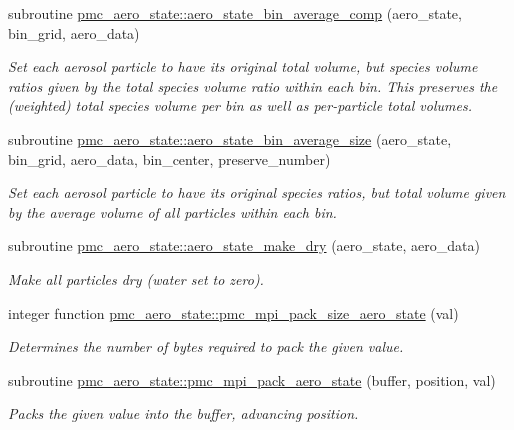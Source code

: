 \begin{DoxyCompactItemize}
subroutine \mbox{\hyperlink{namespacepmc__aero__state_ab056de58c6dda08da7f81ef695326c89}{pmc\+\_\+aero\+\_\+state\+::aero\+\_\+state\+\_\+bin\+\_\+average\+\_\+comp}} (aero\+\_\+state, bin\+\_\+grid, aero\+\_\+data)
\begin{DoxyCompactList}\small\item\em Set each aerosol particle to have its original total volume, but species volume ratios given by the total species volume ratio within each bin. This preserves the (weighted) total species volume per bin as well as per-\/particle total volumes. \end{DoxyCompactList}\item 
subroutine \mbox{\hyperlink{namespacepmc__aero__state_a3a54c3ceabc9c8f2bb878555a6b4c98a}{pmc\+\_\+aero\+\_\+state\+::aero\+\_\+state\+\_\+bin\+\_\+average\+\_\+size}} (aero\+\_\+state, bin\+\_\+grid, aero\+\_\+data, bin\+\_\+center, preserve\+\_\+number)
\begin{DoxyCompactList}\small\item\em Set each aerosol particle to have its original species ratios, but total volume given by the average volume of all particles within each bin. \end{DoxyCompactList}\item 
subroutine \mbox{\hyperlink{namespacepmc__aero__state_a7e64dc08790a4600076982a43fe76221}{pmc\+\_\+aero\+\_\+state\+::aero\+\_\+state\+\_\+make\+\_\+dry}} (aero\+\_\+state, aero\+\_\+data)
\begin{DoxyCompactList}\small\item\em Make all particles dry (water set to zero). \end{DoxyCompactList}\item 
integer function \mbox{\hyperlink{namespacepmc__aero__state_a9f65a578f1f08ed22c56a96686743cfd}{pmc\+\_\+aero\+\_\+state\+::pmc\+\_\+mpi\+\_\+pack\+\_\+size\+\_\+aero\+\_\+state}} (val)
\begin{DoxyCompactList}\small\item\em Determines the number of bytes required to pack the given value. \end{DoxyCompactList}\item 
subroutine \mbox{\hyperlink{namespacepmc__aero__state_a4123bbc6bc887c5d4b7a6feae25be534}{pmc\+\_\+aero\+\_\+state\+::pmc\+\_\+mpi\+\_\+pack\+\_\+aero\+\_\+state}} (buffer, position, val)
\begin{DoxyCompactList}\small\item\em Packs the given value into the buffer, advancing position. \end{DoxyCompactList}\item 

\end{DoxyCompactItemize}
